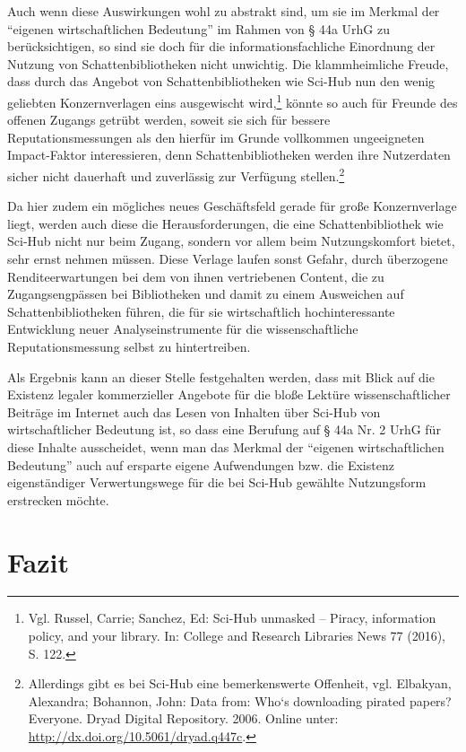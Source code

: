\documentclass[a4paper,
fontsize=11pt,
oneside,
numbers=noperiodatend,
parskip=half-,
bibliography=totoc,
final
]{scrartcl}
\begin{document}
Auch wenn diese Auswirkungen wohl zu abstrakt sind, um sie im Merkmal
der \enquote{eigenen wirtschaftlichen Bedeutung} im Rahmen von § 44a
UrhG zu berücksichtigen, so sind sie doch für die informationsfachliche
Einordnung der Nutzung von Schattenbibliotheken nicht unwichtig. Die
klammheimliche Freude, dass durch das Angebot von Schattenbibliotheken
wie Sci-Hub nun den wenig geliebten Konzernverlagen eins ausgewischt
wird,\footnote{Vgl. Russel, Carrie; Sanchez, Ed: Sci-Hub unmasked --
  Piracy, information policy, and your library. In: College and Research
  Libraries News 77 (2016), S. 122.} könnte so auch für Freunde des
offenen Zugangs getrübt werden, soweit sie sich für bessere
Reputationsmessungen als den hierfür im Grunde vollkommen ungeeigneten
Impact-Faktor interessieren, denn Schattenbibliotheken werden ihre
Nutzerdaten sicher nicht dauerhaft und zuverlässig zur Verfügung
stellen.\footnote{Allerdings gibt es bei Sci-Hub eine bemerkenswerte
  Offenheit, vgl. Elbakyan, Alexandra; Bohannon, John: Data from: Who`s
  downloading pirated papers? Everyone. Dryad Digital Repository. 2006.
  Online unter: \url{http://dx.doi.org/10.5061/dryad.q447c}.}

Da hier zudem ein mögliches neues Geschäftsfeld gerade für große
Konzernverlage liegt, werden auch diese die Herausforderungen, die eine
Schattenbibliothek wie Sci-Hub nicht nur beim Zugang, sondern vor allem
beim Nutzungskomfort bietet, sehr ernst nehmen müssen. Diese Verlage
laufen sonst Gefahr, durch überzogene Renditeerwartungen bei dem von
ihnen vertriebenen Content, die zu Zugangsengpässen bei Bibliotheken und
damit zu einem Ausweichen auf Schattenbibliotheken führen, die für sie
wirtschaftlich hochinteressante Entwicklung neuer Analyseinstrumente für
die wissenschaftliche Reputationsmessung selbst zu hintertreiben.

Als Ergebnis kann an dieser Stelle festgehalten werden, dass mit Blick
auf die Existenz legaler kommerzieller Angebote für die bloße Lektüre
wissenschaftlicher Beiträge im Internet auch das Lesen von Inhalten über
Sci-Hub von wirtschaftlicher Bedeutung ist, so dass eine Berufung auf §
44a Nr. 2 UrhG für diese Inhalte ausscheidet, wenn man das Merkmal der
\enquote{eigenen wirtschaftlichen Bedeutung} auch auf ersparte eigene
Aufwendungen bzw. die Existenz eigenständiger Verwertungswege für die
bei Sci-Hub gewählte Nutzungsform erstrecken möchte.

\section*{Fazit}\label{fazit}
\end{document}
